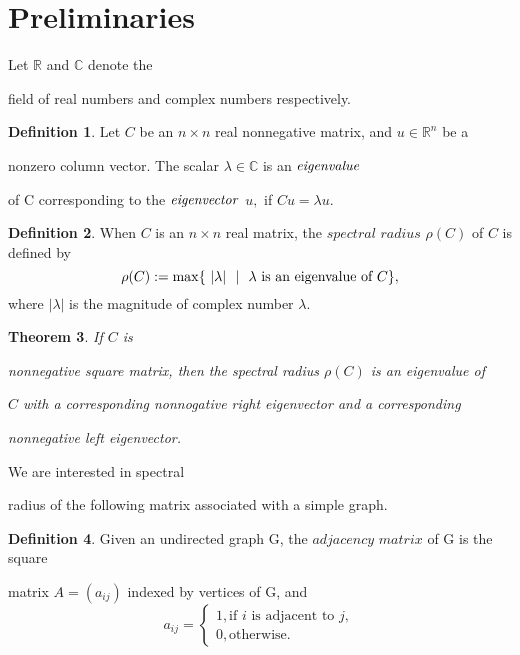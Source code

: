 \documentclass{article}
\theoremstyle{plain}
\newtheorem{thm}{Theorem}[chapter]
\theoremstyle{definition}
\newtheorem{defn}[thm]{Definition}
\begin{document}
\section{Preliminaries}
    
    Let $\mathbb{R}$ and $\mathbb{C}$ denote the 

field of real numbers and complex numbers respectively.
    \begin{defn}
        

Let $C$ be an $n \times n$ real nonnegative matrix, and $u \in \mathbb{R}^n$ be a 

nonzero column vector. The scalar $\lambda \in \mathbb{C}$ is an $\it{eigenvalue}$ 

of C corresponding to the $\it{eigenvector}$ $u,$  if $Cu = \lambda u.$
        

    \end{defn}
 

   \begin{defn}
        When $C$ is an $n \times n$ real matrix, the $\textit 

{spectral radius} $ $\rho(C)$ of $C$ is defined by
        $$\rho(C):=\max\{~|

\lambda|~\ |~~\lambda\hbox{ is an eigenvalue of $C$}\},$$
        where $|

\lambda|$ is the magnitude of complex number $\lambda.$
    \end{defn}

    

\begin{thm} 
        If $C$ is 

nonnegative square matrix, then the spectral radius $\rho(C)$ is an eigenvalue of 

$C$ with a corresponding nonnogative right eigenvector and a corresponding 

nonnegative left eigenvector.
    \end{thm}

    We are interested in spectral 

radius of the following matrix associated with a simple graph.

    \begin{defn}
  

  Given an undirected graph G, the$\textit{ adjacency matrix}$ of G is the square 

matrix $A = (a_{ij})$ indexed by vertices of G, and
    \[a_{ij} =\begin{cases}
   

 1, \text{if $i$ is adjacent to $j$}, \\
    0, \text{otherwise.}
    \end{cases}
 

   \]
    \end{defn}
    
\end{document}
